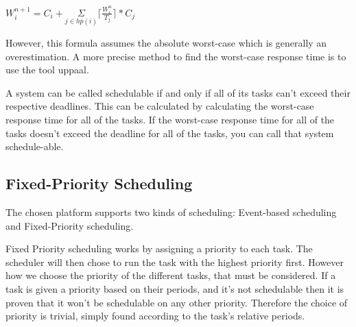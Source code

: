 $W_{i}^{n+1} =  C_{i} + \underset{j\in hp(i)}{\Sigma} \lceil\frac{W_{i}^n}{T_{j}}\rceil*C_{j} $

However, this formula assumes the absolute worst-case which is generally an overestimation. A more precise method to find the worst-case response time is to use the tool uppaal.

A system can be called schedulable if and only if all of its tasks can't exceed their respective deadlines. This can be calculated by calculating the worst-case response time for all of the tasks. If the worst-case response time for all of the tasks doesn't exceed the deadline for all of the tasks, you can call that system schedule-able.\cite{roadRules}










\subsection{\textbf{Fixed-Priority Scheduling}}\label{prioratySch}
The chosen platform supports two kinds of scheduling: Event-based scheduling and Fixed-Priority scheduling\cite{OILManual}. 

Fixed Priority scheduling works by assigning a priority to each task. The scheduler will then chose to run the task with the highest priority first. However how we choose the priority of the different tasks,  that must be considered. If a task is given a priority based on their periods, and it's not schedulable then it is proven that it won't be schedulable on any other priority. Therefore the choice of priority is trivial, simply found according to the task's relative periods.

